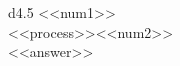 
\begin{tabular}{d{4.5}}
    <<num1>> \\
    <<process>>\enspace<<num2>> \\
    \hline
    <<answer>> \\
    \hline\\
\end{tabular}
